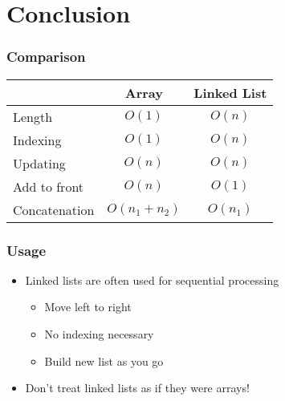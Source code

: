 \section{Conclusion}

\frame{\tableofcontents[currentsection]}

\begin{frame}
    \frametitle{Comparison}
    \begin{center}
        \begin{tabular}{lcc}
            & \textbf{Array} & \textbf{Linked List} \\
            \midrule
            Length & $O(1)$ & $O(n)$ \\
            Indexing & $O(1)$ & $O(n)$ \\
            Updating & $O(n)$ & $O(n)$ \\
            Add to front & $O(n)$ & $O(1)$ \\
            Concatenation & $O(n_1+n_2)$ & $O(n_1)$ \\
            \bottomrule
        \end{tabular}
    \end{center}
\end{frame}

\begin{frame}
    \frametitle{Usage}
    \begin{itemize}
        \item Linked lists are often used for sequential processing
              \begin{itemize}
                \item Move left to right
                \item No indexing necessary
                \item Build new list as you go
              \end{itemize}
        \item Don't treat linked lists as if they were arrays!
    \end{itemize}
\end{frame}